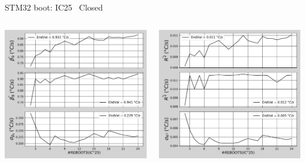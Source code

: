 \begin{frame}{STM32 boot: IC25 \textrightarrow\ Closed}
	\vspace{5mm}
	\begin{columns}
		\begin{column}{0.5\textwidth}
			\includegraphics[width=1.0\textwidth]{./figures/flistCircuit25_25_sl30beta0.pdf}
		\end{column}
		\begin{column}{0.5\textwidth}
			\includegraphics[width=1.0\textwidth]{./figures/flistCircuit25_25_sl30r2.pdf}
		\end{column}
	\end{columns}
\end{frame}

